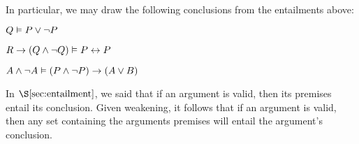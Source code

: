 In particular, we may draw the following conclusions from the entailments above:

\begin{earg}
  \item[] $Q \vDash P \vee \neg P$
  \item[] $R \rightarrow (Q \wedge \neg Q)\vDash P \leftrightarrow P$
  \item[] $A \wedge \neg A \vDash (P \wedge\neg P)\rightarrow (A \vee B)$
\end{earg}

In $\S\ref{sec:entailment}$, we said that if an argument is valid, then its premises entail its conclusion.
Given weakening, it follows that if an argument is valid, then any set containing the arguments premises will entail the argument's conclusion.





